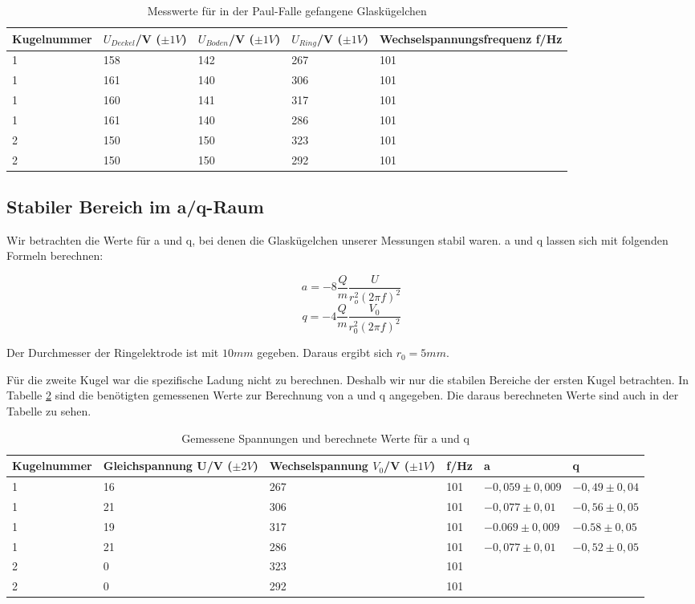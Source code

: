 \documentclass[10pt,a4paper]{article}
\begin{document}
\begin{table}[h!]
	\centering
	\begin{tabular}{|l|l|l|l|l|}\hline
		Kugelnummer & $U_{Deckel}$/V ($\pm 1V$)& $U_{Boden}$/V ($\pm 1V$)& $U_{Ring}$/V ($\pm 1V$)& Wechselspannungsfrequenz f/Hz\\\hline
		1 & 158 & 142 & 267 & 101\\
		1 & 161 & 140 & 306 & 101\\
		1 & 160 & 141 & 317 & 101\\
		1 & 161 & 140 & 286 & 101\\
		2 & 150 & 150 & 323 & 101\\
		2 & 150 & 150 & 292 & 101\\\hline
	\end{tabular}
	\caption{Messwerte für in der Paul-Falle gefangene Glaskügelchen}
	\label{gefangen}
\end{table}

\subsection{Stabiler Bereich im a/q-Raum}

Wir betrachten die Werte für a und q, bei denen die Glaskügelchen unserer Messungen stabil waren. a und q lassen sich mit folgenden Formeln berechnen:

\begin{equation}
	a = -8 \frac{Q}{m} \frac{U}{r_o^2 (2 \pi f)^2}
\end{equation}
\begin{equation}
	q = -4 \frac{Q}{m} \frac{V_0}{r_0^2 (2\pi f)^2}
\end{equation}

Der Durchmesser der Ringelektrode ist mit $10mm$ gegeben. Daraus ergibt sich $r_0 = 5mm$.

Für die zweite Kugel war die spezifische Ladung nicht zu berechnen. Deshalb wir nur die stabilen Bereiche der ersten Kugel betrachten. In Tabelle \ref{gefangen2} sind die benötigten gemessenen Werte zur Berechnung von a und q angegeben. Die daraus berechneten Werte sind auch in der Tabelle zu sehen.

\begin{table}[h!]
	\centering
	\begin{tabular}{|l|l|l|l|l|l|}\hline
		Kugelnummer & Gleichspannung U/V ($\pm 2V$) & Wechselspannung $V_0$/V ($\pm 1V$)& f/Hz & a & q\\\hline
		1 & 16 & 267 & 101 & $-0,059 \pm 0,009$ & $-0,49 \pm 0,04$\\
		1 & 21 & 306 & 101 & $-0,077 \pm 0,01$ & $-0,56 \pm 0,05$\\
		1 & 19 & 317 & 101 & $-0.069 \pm 0,009$ & $-0.58 \pm 0,05$\\
		1 & 21 & 286 & 101 & $-0,077 \pm 0,01$ & $-0,52 \pm 0,05$\\
		2 & 0 & 323 & 101 &&\\
		2 & 0 & 292 & 101 &&\\\hline
	\end{tabular}
	\caption{Gemessene Spannungen und berechnete Werte für a und q}
	\label{gefangen2}
\end{table}
\end{document}
